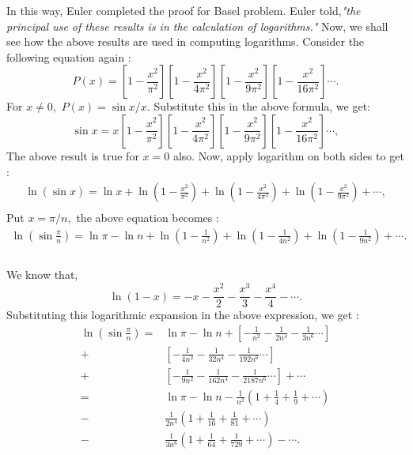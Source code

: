 \documentclass[a4paper,reqno,11pt]{book}
\theoremstyle{plain}%
\theoremstyle{definition}
\begin{document}
In this way, Euler completed the proof for Basel problem. Euler told,\textit{"the principal use of these results is in the calculation of logarithms."} Now, we shall see how the above results are used in computing logarithms.
Consider the following equation again :\\
$$P(x) = \left[1-\frac{x^2}{\pi^2}\right]\left[1-\frac{x^2}{4\pi^2}\right]\left[1-\frac{x^2}{9\pi^2}\right]\left[1-\frac{x^2}{16\pi^2}\right]\cdots.$$
For $x \neq 0,$ $P(x) = \sin x/x.$ Substitute this in the above formula, we get:\\
$$\sin x = x \left[1-\frac{x^2}{\pi^2}\right]\left[1-\frac{x^2}{4\pi^2}\right]\left[1-\frac{x^2}{9\pi^2}\right]\left[1-\frac{x^2}{16\pi^2}\right]\cdots,$$
The above result is true for $x = 0$ also. Now, apply logarithm on both sides to get :\\
\begin{eqnarray*} \ln(\sin x) = \ln x + \ln\left(1-\frac{x^2}{\pi^2}\right) + \ln\left(1-\frac{x^2}{4\pi^2}\right) + \ln\left(1-\frac{x^2}{9\pi^2}\right) + \cdots,\\ \end{eqnarray*}
Put $x = \pi/n,$ the above equation becomes :\\
\begin{eqnarray*} \ln(\sin \frac{\pi}{n}) = \ln \pi - \ln n + \ln\left(1-\frac{1}{n^2}\right) + \ln\left(1-\frac{1}{4n^2}\right) + \ln\left(1-\frac{1}{9n^2}\right) + \cdots.\\ \end{eqnarray*}
\\
We know that,\\
$$\ln(1-x) = -x -\frac{x^2}{2} -\frac{x^3}{3} -\frac{x^4}{4} -\cdots.$$
Substituting this logarithmic expansion in the above expression, we get :\\
\begin{align*}
\ln(\sin \frac{\pi}{n}) =& \ln \pi - \ln n + \left[-\frac{1}{n^2} -\frac{1}{2n^4} -\frac{1}{3n^6} \cdots\right]\\ +& \left[-\frac{1}{4n^2} -\frac{1}{32n^4} -\frac{1}{192n^6}\cdots\right]\\ +& \left[-\frac{1}{9n^2} -\frac{1}{162n^4} -\frac{1}{2187n^6} \cdots\right] + \cdots\\
=& \ln \pi - \ln n - \frac{1}{n^2}\left(1 + \frac{1}{4} + \frac{1}{9} + \cdots\right)\\ -& \frac{1}{2n^4}\left(1 + \frac{1}{16} + \frac{1}{81} + \cdots\right)\\ -& \frac{1}{3n^6}\left(1 + \frac{1}{64} + \frac{1}{729} + \cdots\right) - \cdots.
\end{align*}
\end{document}
